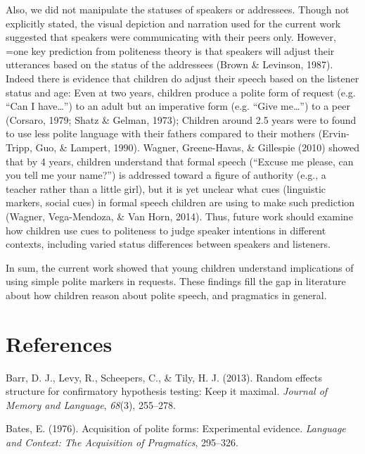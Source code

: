 \documentclass[10pt, letterpaper]{article}
\begin{document}
Also, we did not manipulate the statuses of speakers or addressees.
Though not explicitly stated, the visual depiction and narration used
for the current work suggested that speakers were communicating with
their peers only. However, =one key prediction from politeness theory is
that speakers will adjust their utterances based on the status of the
addressees (Brown \& Levinson, 1987). Indeed there is evidence that
children do adjust their speech based on the listener status and age:
Even at two years, children produce a polite form of request (e.g. ``Can
I have\ldots{}'') to an adult but an imperative form (e.g. ``Give
me\ldots{}'') to a peer (Corsaro, 1979; Shatz \& Gelman, 1973); Children
around 2.5 years were to found to use less polite language with their
fathers compared to their mothers (Ervin-Tripp, Guo, \& Lampert, 1990).
Wagner, Greene-Havas, \& Gillespie (2010) showed that by 4 years,
children understand that formal speech (``Excuse me please, can you tell
me your name?'') is addressed toward a figure of authority (e.g., a
teacher rather than a little girl), but it is yet unclear what cues
(linguistic markers, social cues) in formal speech children are using to
make such prediction (Wagner, Vega-Mendoza, \& Van Horn, 2014). Thus,
future work should examine how children use cues to politeness to judge
speaker intentions in different contexts, including varied status
differences between speakers and listeners.

In sum, the current work showed that young children understand
implications of using simple polite markers in requests. These findings
fill the gap in literature about how children reason about polite
speech, and pragmatics in general.

\section{References}\label{references}

\setlength{\parindent}{-0.1in} \setlength{\leftskip}{0.125in} \noindent

\hypertarget{refs}{}
\hypertarget{ref-barr2013}{}
Barr, D. J., Levy, R., Scheepers, C., \& Tily, H. J. (2013). Random
effects structure for confirmatory hypothesis testing: Keep it maximal.
\emph{Journal of Memory and Language}, \emph{68}(3), 255--278.

\hypertarget{ref-bates1976}{}
Bates, E. (1976). Acquisition of polite forms: Experimental evidence.
\emph{Language and Context: The Acquisition of Pragmatics}, 295--326.
\end{document}
